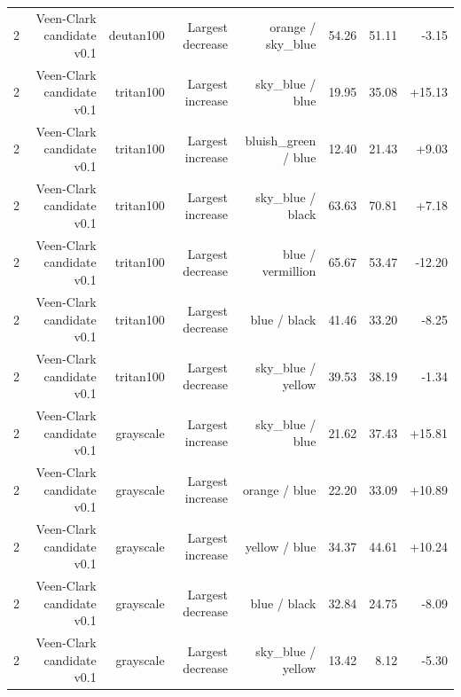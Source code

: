 \begin{tabular}{lrrrrrrr}
2 & Veen-Clark candidate v0.1 & deutan100 & Largest decrease & orange / sky\_blue & 54.26 & 51.11 & -3.15 \\
2 & Veen-Clark candidate v0.1 & tritan100 & Largest increase & sky\_blue / blue & 19.95 & 35.08 & +15.13 \\
2 & Veen-Clark candidate v0.1 & tritan100 & Largest increase & bluish\_green / blue & 12.40 & 21.43 & +9.03 \\
2 & Veen-Clark candidate v0.1 & tritan100 & Largest increase & sky\_blue / black & 63.63 & 70.81 & +7.18 \\
2 & Veen-Clark candidate v0.1 & tritan100 & Largest decrease & blue / vermillion & 65.67 & 53.47 & -12.20 \\
2 & Veen-Clark candidate v0.1 & tritan100 & Largest decrease & blue / black & 41.46 & 33.20 & -8.25 \\
2 & Veen-Clark candidate v0.1 & tritan100 & Largest decrease & sky\_blue / yellow & 39.53 & 38.19 & -1.34 \\
2 & Veen-Clark candidate v0.1 & grayscale & Largest increase & sky\_blue / blue & 21.62 & 37.43 & +15.81 \\
2 & Veen-Clark candidate v0.1 & grayscale & Largest increase & orange / blue & 22.20 & 33.09 & +10.89 \\
2 & Veen-Clark candidate v0.1 & grayscale & Largest increase & yellow / blue & 34.37 & 44.61 & +10.24 \\
2 & Veen-Clark candidate v0.1 & grayscale & Largest decrease & blue / black & 32.84 & 24.75 & -8.09 \\
2 & Veen-Clark candidate v0.1 & grayscale & Largest decrease & sky\_blue / yellow & 13.42 & 8.12 & -5.30 \\
\bottomrule
\end{tabular}
